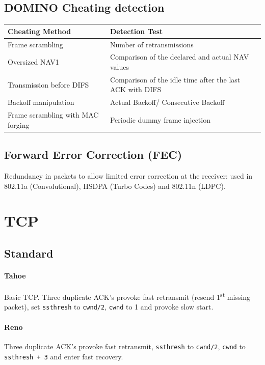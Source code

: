 \documentclass[10pt, a4paper,twocolumn]{scrartcl}
\begin{document}
\subsection{DOMINO Cheating detection}
\begin{tabular}{|p{4cm}|p{5.2cm}|}
  \hline
  Cheating Method & Detection Test \\\hline
  Frame scrambling & Number of retransmissions \\
  Oversized NAV1 & Comparison of the declared and actual NAV values\\
  Transmission before DIFS & Comparison of the idle time after the last ACK with DIFS \\
  Backoff manipulation & Actual Backoff/ Consecutive Backoff \\
  Frame scrambling with MAC forging & Periodic dummy frame injection\\
   \hline
\end{tabular}

\subsection{Forward Error Correction (FEC)}
Redundancy in packets to allow limited error correction at the receiver: used in 802.11a (Convolutional), HSDPA (Turbo Codes) and 802.11n (LDPC).

\section{TCP}

\subsection{Standard}

\paragraph{Tahoe} Basic TCP. Three duplicate ACK's provoke fast retransmit (resend 1\textsuperscript{st} missing packet), set \texttt{ssthresh} to \texttt{cwnd/2}, \texttt{cwnd} to 1 and provoke slow start.

\paragraph{Reno} Three duplicate ACK's provoke fast retransmit, \texttt{ssthresh} to \texttt{cwnd/2}, \texttt{cwnd} to \texttt{ssthresh + 3} and enter fast recovery.
\end{document}
